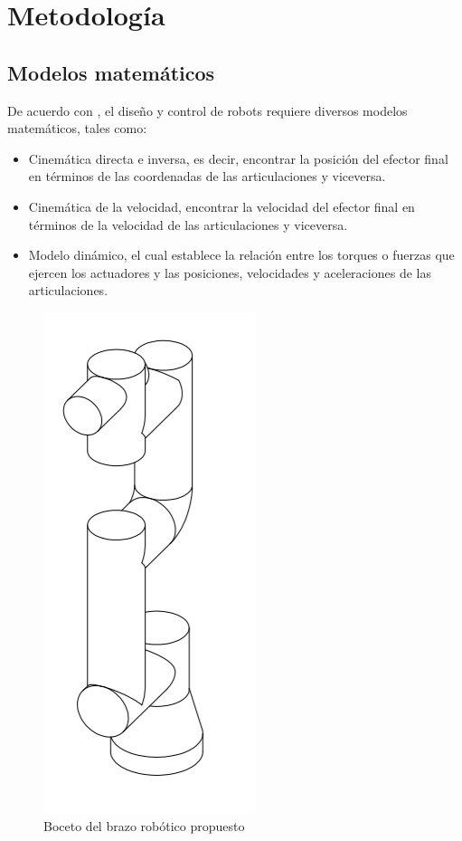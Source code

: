 \chapter{Metodología}

\section{Modelos matemáticos}

De acuerdo con \cite{Dombre2007}, el diseño y control de robots requiere diversos modelos matemáticos, tales como:

\begin{itemize}
\itemsep0em 

\item Cinemática directa e inversa, es decir, encontrar la posición del efector final en términos de las coordenadas de las articulaciones y viceversa.
\item Cinemática de la velocidad, encontrar la velocidad del efector final en términos de la velocidad de las articulaciones y viceversa.
\item Modelo dinámico, el cual establece la relación entre los torques o fuerzas que ejercen los actuadores y las posiciones, velocidades y aceleraciones de las articulaciones.
\end{itemize}

\begin{figure}
    \centering
    \includegraphics[scale=0.7]{./img/chapter4/robotarmprototype.png}
    \caption{Boceto del brazo robótico propuesto}
    \label{fig:roboticarmprototype}
\end{figure}

